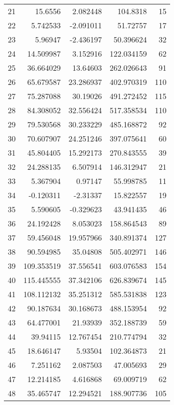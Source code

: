 \documentclass[dvipsnames, svgnames,a4paper,11pt]{article}
\begin{document}
\begin{longtable}{|r|r|r|r|r|}
	21 & 15.6556    & 2.082448    & 104.8318   & 15  \\
	22 & 5.742533   & -2.091011   & 51.72757   & 17  \\
	23 & 5.96947    & -2.436197   & 50.396624  & 32  \\
	24 & 14.509987  & 3.152916    & 122.034159 & 62  \\
	25 & 36.664029  & 13.64603    & 262.026643 & 91  \\
	26 & 65.679587  & 23.286937   & 402.970319 & 110 \\
	27 & 75.287088  & 30.19026    & 491.272452 & 115 \\
	28 & 84.308052  & 32.556424   & 517.358534 & 110 \\
	29 & 79.530568  & 30.233229   & 485.168872 & 92  \\
	30 & 70.607907  & 24.251246   & 397.075641 & 60  \\
	31 & 45.804405  & 15.292173   & 270.843555 & 39  \\
	32 & 24.288135  & 6.507914    & 146.312947 & 21  \\
	33 & 5.367904   & 0.97147     & 55.998785  & 11  \\
	34 & -0.120311  & -2.31337    & 15.822557  & 19  \\
	35 & 5.590605   & -0.329623   & 43.941435  & 46  \\
	36 & 24.192428  & 8.053023    & 158.864543 & 89  \\
	37 & 59.456048  & 19.957966   & 340.891374 & 127 \\
	38 & 90.594985  & 35.04808    & 505.402971 & 146 \\
	39 & 109.353519 & 37.556541   & 603.076583 & 154 \\
	40 & 115.445555 & 37.342106   & 626.839674 & 145 \\
	41 & 108.112132 & 35.251312   & 585.531838 & 123 \\
	42 & 90.187634  & 30.168673   & 488.153954 & 92  \\
	43 & 64.477001  & 21.93939    & 352.188739 & 59  \\
	44 & 39.94115   & 12.767454   & 210.774794 & 32  \\
	45 & 18.646147  & 5.93504     & 102.364873 & 21  \\
	46 & 7.251162   & 2.087503    & 47.005693  & 29  \\
	47 & 12.214185  & 4.616868    & 69.009719  & 62  \\
	48 & 35.465747  & 12.294521   & 188.907736 & 105 \\

\end{longtable}
\end{document}
